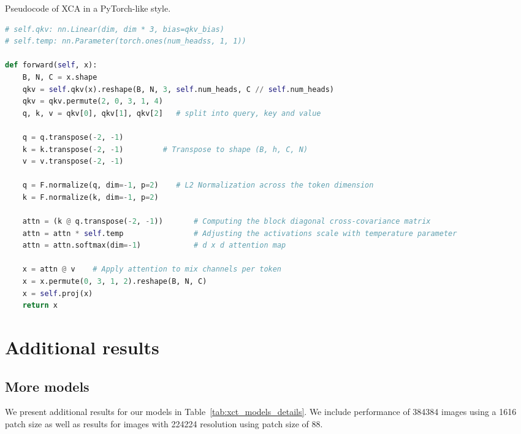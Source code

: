 \begin{algorithm}[htb]
\caption{Pseudocode of XCA  in a PyTorch-like style.}
\label{alg:code}
\begin{lstlisting}[language=python]
# self.qkv: nn.Linear(dim, dim * 3, bias=qkv_bias)
# self.temp: nn.Parameter(torch.ones(num_headss, 1, 1))

def forward(self, x):
    B, N, C = x.shape
    qkv = self.qkv(x).reshape(B, N, 3, self.num_heads, C // self.num_heads)
    qkv = qkv.permute(2, 0, 3, 1, 4)
    q, k, v = qkv[0], qkv[1], qkv[2]   # split into query, key and value

    q = q.transpose(-2, -1) 
    k = k.transpose(-2, -1)         # Transpose to shape (B, h, C, N)
    v = v.transpose(-2, -1)

    q = F.normalize(q, dim=-1, p=2)    # L2 Normalization across the token dimension
    k = F.normalize(k, dim=-1, p=2)    

    attn = (k @ q.transpose(-2, -1))       # Computing the block diagonal cross-covariance matrix
    attn = attn * self.temp                # Adjusting the activations scale with temperature parameter
    attn = attn.softmax(dim=-1)            # d x d attention map

    x = attn @ v    # Apply attention to mix channels per token 
    x = x.permute(0, 3, 1, 2).reshape(B, N, C)  
    x = self.proj(x)
    return x
\end{lstlisting}
\end{algorithm}














\section{Additional results}

\subsection{More \ours models}

We present additional results for our \ours models in Table~\ref{tab:xct_models_details}. We include performance of 384384 images using a 1616 patch size as well as results for images with 224224 resolution using patch size of 88.

